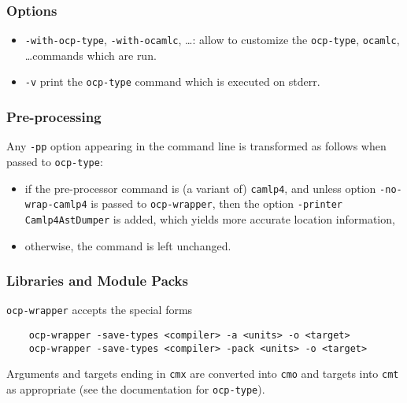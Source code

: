 \subsubsection*{Options}

\begin{itemize}
\item \verb!-with-ocp-type!, \verb!-with-ocamlc!, \ldots: allow to
  customize the \verb!ocp-type!, \verb!ocamlc!, \ldots commands which
  are run.

\item \verb!-v! print the \verb!ocp-type! command which is executed on
  stderr.
\end{itemize}

\subsubsection*{Pre-processing}
Any \verb!-pp! option appearing in the command line is transformed as
follows when passed to \verb!ocp-type!:
\begin{itemize}
\item if the pre-processor command is (a variant of) \verb!camlp4!,
  and unless option \verb!-no-wrap-camlp4! is passed to \verb!ocp-wrapper!,
  then the option \verb!-printer Camlp4AstDumper! is added, which
  yields more accurate location information,
\item otherwise, the command is left unchanged.
\end{itemize}

\subsubsection*{Libraries and Module Packs}

\verb!ocp-wrapper! accepts the special forms
{\verbsize\begin{verbatim}
    ocp-wrapper -save-types <compiler> -a <units> -o <target>
    ocp-wrapper -save-types <compiler> -pack <units> -o <target>
\end{verbatim}}
Arguments and targets ending in \verb!cmx! are converted into \verb!cmo!
and targets into \verb!cmt! as appropriate (see the documentation for
\verb!ocp-type!).
